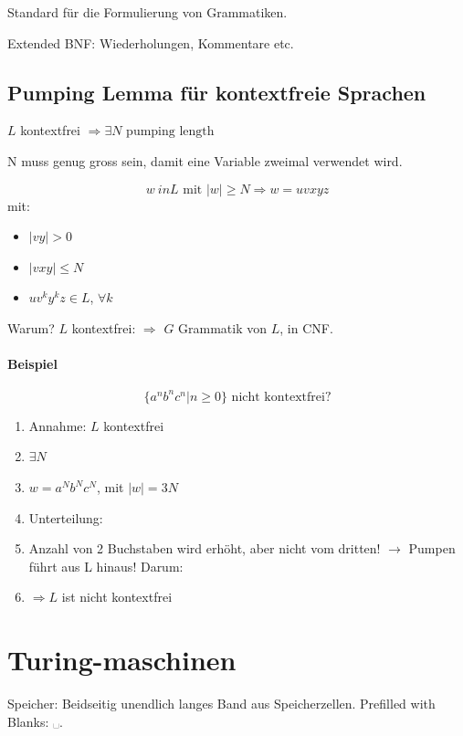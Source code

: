 Standard für die Formulierung von Grammatiken.

Extended BNF: Wiederholungen, Kommentare etc.


\subsection{Pumping Lemma für kontextfreie Sprachen}

$L$ kontextfrei $\Rightarrow \exists N \text{ pumping length }$

N muss genug gross sein, damit eine Variable zweimal verwendet wird.

\[
	w \ in L \text{ mit } |w| \geq N \Rightarrow w = uvxyz
\]
mit:
\begin{itemize}
	\item $|vy| > 0$
	\item $|vxy | \leq N$
	\item $uv^ky^kz \in L$, $\forall k$
\end{itemize}

Warum? $L$ kontextfrei: $\Rightarrow$ $G$ Grammatik von $L$, in CNF.




\paragraph{Beispiel}

\[
	\{a^n b^n c^n | n \geq 0 \} \text{ nicht kontextfrei?}
\]

\begin{enumerate}
	\item Annahme: $L$ kontextfrei
	\item $\exists N$
	\item $w = a^N b^N c^N$, mit $|w| = 3N$
	\item Unterteilung: %
	\item Anzahl von 2 Buchstaben wird erhöht, aber nicht vom dritten!
		$\rightarrow$ Pumpen führt aus L hinaus! Darum:
	\item $\Rightarrow L$ ist nicht kontextfrei
\end{enumerate}

\section{Turing-maschinen}

Speicher: Beidseitig unendlich langes Band aus Speicherzellen. Prefilled with Blanks: ␣.

